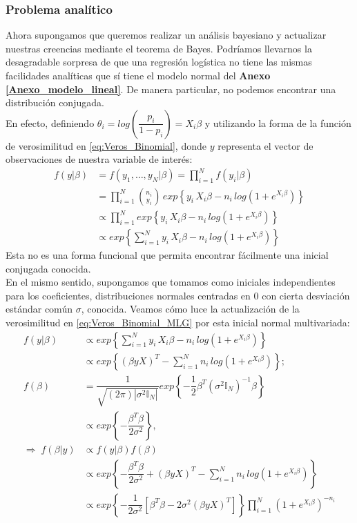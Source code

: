 \subsubsection{Problema analítico} \label{sec:Prob_Analitico}

Ahora supongamos que queremos realizar un análisis bayesiano y actualizar nuestras creencias mediante el teorema de Bayes. Podríamos llevarnos la desagradable sorpresa de que una regresión logística no tiene las mismas facilidades analíticas que sí tiene el modelo normal del \textbf{Anexo \ref{Anexo_modelo_lineal}}. De manera particular, no podemos encontrar una distribución conjugada.\\ 

En efecto, definiendo $\theta_i = log\left(\dfrac{p_i}{1-p_i}\right)=X_i\beta$ y utilizando la forma de la función de verosimilitud en \eqref{eq:Veros_Binomial}, donde $y$ representa el vector de observaciones de nuestra variable de interés: 
\begin{align} \label{eq:Veros_Binomial_MLG} 
f(y|\beta) &= f(y_1,\dots,y_N|\beta)= \prod_{i=1}^N f(y_i|\beta) \nonumber\\
&= \prod_{i=1}^N {n_i\choose y_i}\,exp\left\lbrace y_i\,X_i\beta-n_i\,log\left(1+e^{X_i\beta}\right)\right\rbrace \nonumber\\
&\propto \prod_{i=1}^N exp\left\lbrace y_i\,X_i\beta-n_i\,log\left(1+e^{X_i\beta}\right)\right\rbrace \nonumber\\
&\propto exp\left\lbrace \sum\limits_{i=1}^Ny_i\,X_i\beta-n_i\,log\left(1+e^{X_i\beta}\right)\right\rbrace 
\end{align}
Esta no es una forma funcional que permita encontrar fácilmente una inicial conjugada conocida.\\

En el mismo sentido, supongamos que tomamos como iniciales independientes para los coeficientes, distribuciones normales centradas en $0$ con cierta desviación estándar común $\sigma$, conocida. Veamos cómo luce la actualización de la verosimilitud en \eqref{eq:Veros_Binomial_MLG} por esta inicial normal multivariada: 
\begin{align*}
f(y|\beta) &\propto exp\left\lbrace \sum\limits_{i=1}^N y_i\,X_i\beta-n_i\,log\left(1+e^{X_i\beta}\right)\right\rbrace \\
&\propto exp\left\lbrace (\beta yX)^T-\sum\limits_{i=1}^Nn_i\,log\left(1+e^{X_i\beta}\right)\right\rbrace; \\
f(\beta) &= \dfrac{1}{\sqrt{(2\pi)|\sigma^2 \mathbb{I}_N|}}exp\left\lbrace -\dfrac{1}{2}\beta^T(\sigma^2\mathbb{I}_N)^{-1}\beta\right\rbrace \\
&\propto exp\left\lbrace -\dfrac{\beta^T\beta}{2\sigma^2}\right\rbrace, \\
\Rightarrow \; f(\beta|y)&\propto f(y|\beta)f(\beta) \\
&\propto exp\left\lbrace -\dfrac{\beta^T\beta}{2\sigma^2} + (\beta yX)^T-\sum\limits_{i=1}^Nn_i\,log\left(1+e^{X_i\beta}\right)\right\rbrace \\
&\propto exp\left\lbrace -\dfrac{1}{2\sigma^2}\left[\beta^T\beta - 2\sigma^2(\beta yX)^T\right]\right\rbrace\prod_{i=1}^N \left(1+e^{X_i\beta}\right)^{-n_i}
\end{align*}


